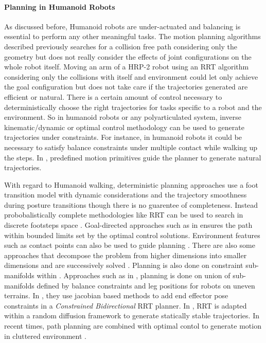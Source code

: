 \paragraph{Planning in Humanoid Robots}


As discussed before, Humanoid robots are under-actuated and balancing is essential to perform any other meaningful tasks. The motion planning algorithms described previously searches for a collision free path considering only the geometry but does not really consider the effects of joint configurations on the whole robot itself. Moving an arm of a HRP-2 robot using an RRT algorithm considering only the collisions with itself and environment could let only achieve the goal configuration but does not take care if the trajectories generated are efficient or natural. There is a certain amount of control necessary to deterministically choose the right trajectories for tasks specific to a robot and the environment. So in humanoid robots or any polyarticulated system, inverse kinematic/dynamic or optimal control methodology can be used to generate trajectories under constraints. For instance, in humanoid robots it could be necessary to satisfy balance constraints under multiple contact while walking up the steps. In \cite{zhang2014motion}, predefined motion primitives guide the planner to generate natural trajectories.

With regard to Humanoid walking, deterministic planning approaches use a foot transition model with dynamic considerations and the trajectory smoothness during posture transitions \cite{chestnutt2005footstep,ayaz2007human} though there is no guarentee of completeness. Instead probobalistically complete methodologies like RRT can be used to search in discrete footsteps space \cite{perrin2012fast,xia2009random}. Goal-directed approaches such as in \cite{hornung2013search} ensures the path within bounded limits set by the optimal control solutions. Environment features such as contact points can also be used to guide planning \cite{bouyarmane2012dynamics,Escande2013}. There are also some approaches that decompose the problem from higher dimensions into smaller dimensions and are successively solved \cite{zhang2009motion,yoshida2008planning}. Planning is also done on constraint sub-manifolds within \CS{}. Approaches such as in \cite{bretl2006motion,hauser2010multi}, planning is done on union of sub-manifolds defined by balance constraints and leg positions for robots on uneven terrains. In \cite{berenson2011task}, they use jacobian based methods 
to add end effector pose constraints in a \textit{Constrained Bidirectional} RRT planner. In \cite{dalibard2013dynamic}, RRT is adapted within a random diffusion framework to generate statically stable trajectories. In recent times, path planning are combined with optimal contol to generate motion in cluttered environment \cite{el2013optimal}.

